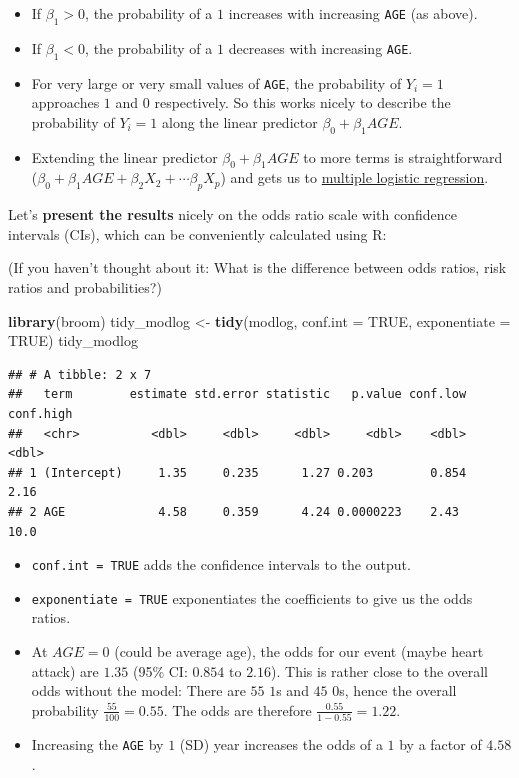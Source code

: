 \documentclass[
]{article}
\newenvironment{Shaded}{\begin{snugshade}}{\end{snugshade}}
\newcommand{\AttributeTok}[1]{\textcolor[rgb]{0.13,0.29,0.53}{#1}}
\newcommand{\ConstantTok}[1]{\textcolor[rgb]{0.56,0.35,0.01}{#1}}
\newcommand{\FunctionTok}[1]{\textcolor[rgb]{0.13,0.29,0.53}{\textbf{#1}}}
\newcommand{\NormalTok}[1]{#1}
\newcommand{\OtherTok}[1]{\textcolor[rgb]{0.56,0.35,0.01}{#1}}
\providecommand{\tightlist}{%
  \setlength{\itemsep}{0pt}\setlength{\parskip}{0pt}}
\begin{document}
\begin{itemize}
\tightlist
\item
  If \(\beta_1 > 0\), the probability of a \(1\) increases with
  increasing \texttt{AGE} (as above).
\item
  If \(\beta_1 < 0\), the probability of a \(1\) decreases with
  increasing \texttt{AGE}.
\item
  For very large or very small values of \texttt{AGE}, the probability
  of \(Y_i = 1\) approaches \(1\) and \(0\) respectively. So this works
  nicely to describe the probability of \(Y_i = 1\) along the linear
  predictor \(\beta_0 + \beta_1 AGE\).
\item
  Extending the linear predictor \(\beta_0 + \beta_1 AGE\) to more terms
  is straightforward
  (\(\beta_0 + \beta_1 AGE + \beta_2 X_2 + \cdots \beta_p X_p\)) and
  gets us to \hyperref[multiple_logistic_regression]{multiple logistic
  regression}.
\end{itemize}

Let's \textbf{present the results} nicely on the odds ratio scale with
confidence intervals (CIs), which can be conveniently calculated using
R:

(If you haven't thought about it: What is the difference between odds
ratios, risk ratios and probabilities?)

\begin{Shaded}
\begin{Highlighting}[]
\FunctionTok{library}\NormalTok{(broom)}
\NormalTok{tidy\_modlog }\OtherTok{\textless{}{-}} \FunctionTok{tidy}\NormalTok{(modlog, }\AttributeTok{conf.int =} \ConstantTok{TRUE}\NormalTok{, }\AttributeTok{exponentiate =} \ConstantTok{TRUE}\NormalTok{)}
\NormalTok{tidy\_modlog}
\end{Highlighting}
\end{Shaded}

\begin{verbatim}
## # A tibble: 2 x 7
##   term        estimate std.error statistic   p.value conf.low conf.high
##   <chr>          <dbl>     <dbl>     <dbl>     <dbl>    <dbl>     <dbl>
## 1 (Intercept)     1.35     0.235      1.27 0.203        0.854      2.16
## 2 AGE             4.58     0.359      4.24 0.0000223    2.43      10.0
\end{verbatim}

\begin{itemize}
\tightlist
\item
  \texttt{conf.int\ =\ TRUE} adds the confidence intervals to the
  output.
\item
  \texttt{exponentiate\ =\ TRUE} exponentiates the coefficients to give
  us the odds ratios.
\item
  At \(AGE=0\) (could be average age), the odds for our event (maybe
  heart attack) are \(1.35\) (95\% CI: \(0.854\text{ to }2.16\)). This
  is rather close to the overall odds without the model: There are
  \(55\) \(1\)s and \(45\) \(0\)s, hence the overall probability
  \(\frac{55}{100} = 0.55\). The odds are therefore
  \(\frac{0.55}{1-0.55} = 1.22\).
\item
  Increasing the \texttt{AGE} by \(1\) (SD) year increases the odds of a
  \(1\) by a factor of \(4.58\).
\end{itemize}
\end{document}
